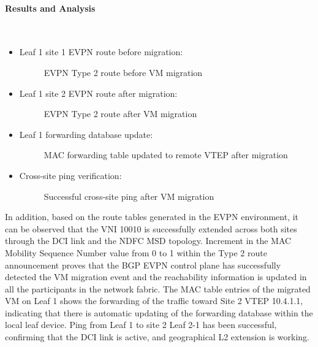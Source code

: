 \paragraph{Results and Analysis}~\\
\begin{itemize}
    \item []Leaf 1 site 1 EVPN route before migration:
    \begin{figure}[!htbp]
        \centering
        \beformigration
        \caption{EVPN Type 2 route before VM migration}
        \label{fig:evpn-before-migration}
    \end{figure}
    \item []Leaf 1 site 2 EVPN route after migration:
    \begin{figure}[!htbp]
        \centering
        \aftermigration
        \caption{EVPN Type 2 route after VM migration}
        \label{fig:evpn-after-migration}
    \end{figure}
    \item []Leaf 1 forwarding database update:
    \begin{figure}[!htbp]
        \centering
        \forwardingdatabase
        \caption{MAC forwarding table updated to remote VTEP after migration}
        \label{fig:forwarding-database}
    \end{figure}
    \item []Cross-site ping verification:
    \begin{figure}[!htbp]
        \centering
        \crosssite
        \caption{Successful cross-site ping after VM migration}
        \label{fig:cross-site-ping-after-vmotion}
    \end{figure}
\end{itemize}
In addition, based on the route tables generated in the EVPN environment, it can be observed that the VNI 10010 is successfully extended across both sites through the DCI link and the NDFC MSD topology. Increment in the MAC Mobility Sequence Number value from 0 to 1 within the Type 2 route announcement proves that the BGP EVPN control plane has successfully detected the VM migration event and the reachability information is updated in all the participants in the network fabric. The MAC table entries of the migrated VM on Leaf 1 shows the forwarding of the traffic toward Site 2 VTEP 10.4.1.1, indicating that there is automatic updating of the forwarding database within the local leaf device. Ping from Leaf 1 to site 2 Leaf 2-1 has been successful, confirming that the DCI link is active, and geographical L2 extension is working.

